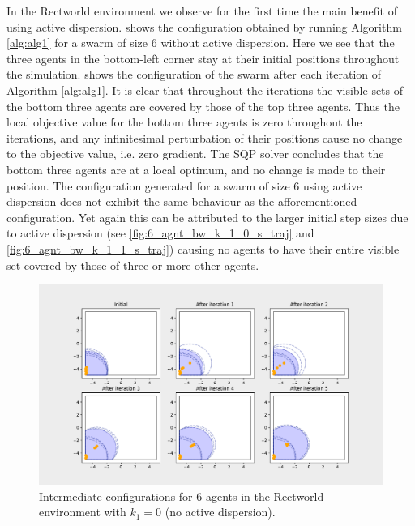 In the Rectworld environment we observe for the first time the main benefit of using active dispersion.  shows the configuration obtained
by running Algorithm \ref{alg:alg1} for a swarm of size 6 without active dispersion. Here we see that the three agents in the bottom-left corner stay
at their initial positions throughout the simulation.  shows the configuration of the swarm after each iteration of Algorithm \ref{alg:alg1}. It is clear that 
throughout the iterations the visible sets of the bottom three agents are covered by those of the top three agents. Thus the local objective value for the bottom three agents is zero 
throughout the iterations, and any infinitesimal perturbation of their positions cause no change to the objective value, i.e. zero gradient. The SQP solver concludes that the bottom three agents are at a local
optimum, and no change is made to their position. The configuration generated for a swarm of size 6 using active dispersion does not exhibit the same behaviour as the afforementioned configuration. Yet again this can be attributed to the
larger initial step sizes due to active dispersion (see \ref{fig:6_agnt_bw_k_1_0_s_traj} and \ref{fig:6_agnt_bw_k_1_1_s_traj}) causing no agents to have their entire visible set covered by those of three or more other agents.
\begin{figure}[H]
  \centering
  \includegraphics[width=\textwidth]{figs/bigworld_6_agnt_k_1_0_k_2_1_x_traj.pdf}
  \caption{Intermediate configurations for 6 agents in the Rectworld environment with $k_{1} = 0$ (no active dispersion).}
  \label{fig:bw_x_traj}
\end{figure}



